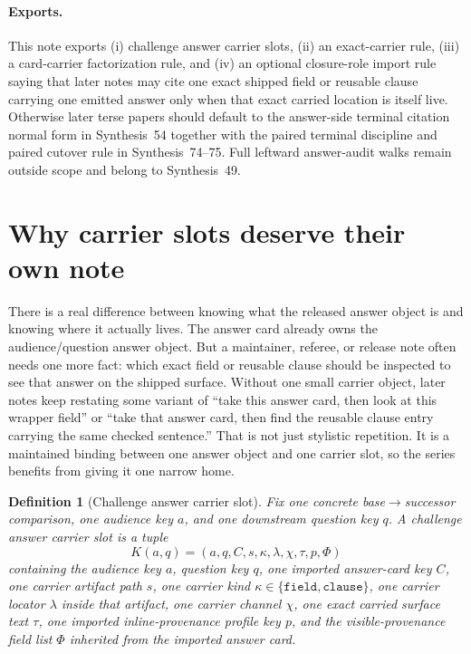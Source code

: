 \documentclass[11pt]{article}
\newtheorem{definition}{Definition}
\begin{document}
\paragraph{Exports.}
This note exports (i) challenge answer carrier slots, (ii) an exact-carrier rule, (iii) a card-carrier factorization rule, and (iv) an optional closure-role import rule saying that later notes may cite one exact shipped field or reusable clause carrying one emitted answer only when that exact carried location is itself live.
Otherwise later terse papers should default to the answer-side terminal citation normal form in Synthesis~54 together with the paired terminal discipline and paired cutover rule in Synthesis~74--75. Full leftward answer-audit walks remain outside scope and belong to Synthesis~49.\cite{series:challengeanswerreviewmenus,series:pairedterminalcitationdiscipline,series:pairedterminalcutoverrules}

\section{Why carrier slots deserve their own note}
There is a real difference between knowing what the released answer object is and knowing where it actually lives.
The answer card already owns the audience/question answer object.
But a maintainer, referee, or release note often needs one more fact: which exact field or reusable clause should be inspected to see that answer on the shipped surface.
Without one small carrier object, later notes keep restating some variant of ``take this answer card, then look at this wrapper field'' or ``take that answer card, then find the reusable clause entry carrying the same checked sentence.''
That is not just stylistic repetition.
It is a maintained binding between one answer object and one carrier slot, so the series benefits from giving it one narrow home.

\begin{definition}[Challenge answer carrier slot]
Fix one concrete base$\to$successor comparison, one audience key $a$, and one downstream question key $q$.
A \emph{challenge answer carrier slot} is a tuple
\[
K(a,q)=(a,q,C,s,\kappa,\lambda,\chi,\tau,p,\Phi)
\]
containing the audience key $a$, question key $q$, one imported answer-card key $C$, one carrier artifact path $s$, one carrier kind $\kappa\in\{\texttt{field},\texttt{clause}\}$, one carrier locator $\lambda$ inside that artifact, one carrier channel $\chi$, one exact carried surface text $\tau$, one imported inline-provenance profile key $p$, and the visible-provenance field list $\Phi$ inherited from the imported answer card.
\end{definition}
\end{document}
